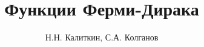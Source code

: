 \documentclass[11pt,a4paper]{book}
\begin{document}
\title{Функции Ферми-Дирака}
\author{Н.Н. Калиткин, С.А. Колганов}
\maketitle
\tableofcontents












\end{document}
